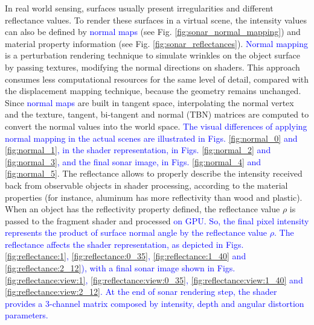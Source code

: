 \documentclass[final,5p,times]{elsarticle}
\begin{document}
In real world sensing, surfaces usually present irregularities
and different reflectance values. To render these surfaces in a virtual scene, the intensity values can also be defined by \textcolor{blue}{normal maps} (see Fig. \ref{fig:sonar_normal_mapping}) and material property information (see Fig. \ref{fig:sonar_reflectances}). \textcolor{blue}{Normal mapping} is a perturbation rendering technique to simulate wrinkles on the object surface by passing textures, modifying the normal directions on shaders. This approach consumes less computational
resources for the same level of detail, compared with the displacement mapping
technique, because the geometry remains unchanged. Since \textcolor{blue}{normal maps} are built in tangent space, interpolating the normal vertex and the texture, tangent, bi-tangent and normal (TBN) matrices are computed to convert the normal values into the world space. \textcolor{blue}{The visual differences of applying normal mapping in the actual scenes are illustrated in Figs. \ref{fig:normal_0} and \ref{fig:normal_1}, in the shader representation, in Figs. \ref{fig:normal_2} and \ref{fig:normal_3}, and the final sonar image, in Figs. \ref{fig:normal_4} and \ref{fig:normal_5}}. The reflectance allows to properly describe the intensity received back from observable objects in shader processing, according to the material
properties (for instance, aluminum has more reflectivity than wood and plastic).
When an object has the reflectivity property defined, the reflectance value
$\rho$ is passed to the fragment shader and processed \textcolor{blue}{on GPU. So, the final pixel intensity represents the product of surface normal angle by the reflectance value $\rho$. The reflectance affects the shader representation, as depicted in Figs. \ref{fig:reflectance:1}, \ref{fig:reflectance:0_35}, \ref{fig:reflectance:1_40} and \ref{fig:reflectance:2_12}), with a final sonar image shown in Figs. \ref{fig:reflectance:view:1}, \ref{fig:reflectance:view:0_35}, \ref{fig:reflectance:view:1_40} and \ref{fig:reflectance:view:2_12}. At the end of sonar rendering step, the shader provides a 3-channel matrix composed by intensity, depth and angular distortion parameters.}
\end{document}
